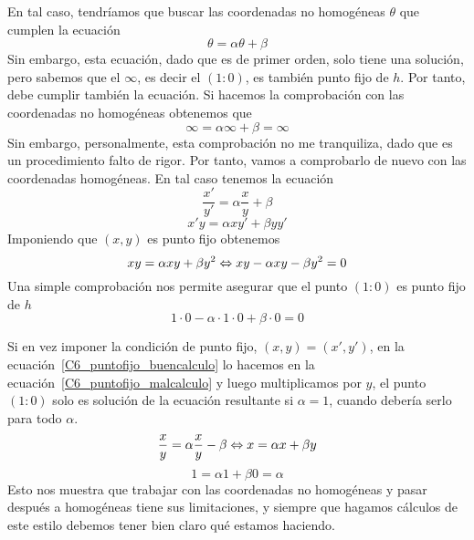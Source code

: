 En tal caso, tendríamos que buscar las coordenadas no homogéneas $\theta$ que cumplen la ecuación
\begin{equation*}
	\theta=\alpha\theta+\beta
\end{equation*}
Sin embargo, esta ecuación, dado que es de primer orden, solo tiene una solución, pero sabemos que el $\infty$, es decir el $(1:0)$, es también punto fijo de $h$. Por tanto, debe cumplir también la ecuación. Si hacemos la comprobación con las coordenadas no homogéneas obtenemos que 
\begin{equation*}
	\infty=\alpha\infty+\beta=\infty
\end{equation*}
Sin embargo, personalmente, esta comprobación no me tranquiliza, dado que es un procedimiento falto de rigor. Por tanto, vamos a comprobarlo de nuevo con las coordenadas homogéneas. En tal caso tenemos la ecuación
\begin{equation}
	\label{C6_puntofijo_malcalculo}
	\frac{x'}{y'}=\alpha\frac{x}{y}+\beta
\end{equation}
\begin{equation}
	\label{C6_puntofijo_buencalculo}
	x'y=\alpha xy'+\beta yy'
\end{equation}
Imponiendo que $(x,y)$ es punto fijo obtenemos 
\begin{equation*}
	 xy=\alpha xy+\beta y^2\Leftrightarrow xy-\alpha xy-\beta y^2=0
\end{equation*}
Una simple comprobación nos permite asegurar que el punto $(1:0)$ es punto fijo de $h$
\begin{equation*}
	1\cdot 0-\alpha\cdot 1\cdot 0+\beta\cdot 0=0
\end{equation*}
\begin{obs}
	Si en vez imponer la condición de punto fijo, $(x,y)=(x',y')$, en la ecuación~\eqref{C6_puntofijo_buencalculo} lo hacemos en la ecuación~\eqref{C6_puntofijo_malcalculo} y luego multiplicamos por $y$, el punto $(1:0)$ solo es solución de la ecuación resultante si $\alpha=1$, cuando debería serlo para todo $\alpha$.
	\begin{equation*}
		\frac{x}{y}=\alpha\frac{x}{y}-\beta\Leftrightarrow x=\alpha x+\beta y
	\end{equation*}
	\begin{equation*}
		 1=\alpha 1+\beta 0=\alpha
	\end{equation*}
	Esto nos muestra que trabajar con las coordenadas no homogéneas y pasar después a homogéneas tiene sus limitaciones, y siempre que hagamos cálculos de este estilo debemos tener bien claro qué estamos haciendo.
\end{obs}

